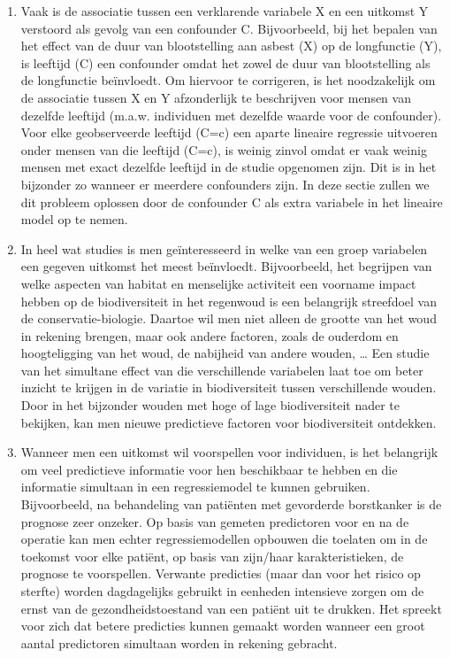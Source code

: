 \documentclass[
  12pt,dutch]{book}
\theoremstyle{definition}
\theoremstyle{definition}
\theoremstyle{definition}
\theoremstyle{definition}
\theoremstyle{remark}
\begin{document}
\begin{enumerate}
\def\labelenumi{\arabic{enumi}.}
\item
  Vaak is de associatie tussen een verklarende variabele X en een uitkomst Y verstoord als gevolg van een confounder C. Bijvoorbeeld, bij het bepalen van het effect van de duur van blootstelling aan asbest (X) op de longfunctie (Y), is leeftijd (C) een confounder omdat het zowel de duur van blootstelling als de longfunctie beïnvloedt. Om hiervoor te corrigeren, is het noodzakelijk om de associatie tussen X en Y afzonderlijk te beschrijven voor mensen van dezelfde leeftijd (m.a.w. individuen met dezelfde waarde voor de confounder). Voor elke geobserveerde leeftijd (C=c) een aparte lineaire regressie uitvoeren onder mensen van die leeftijd (C=c), is weinig zinvol omdat er vaak weinig mensen met exact dezelfde leeftijd in de studie opgenomen zijn. Dit is in het bijzonder zo wanneer er meerdere confounders zijn. In deze sectie zullen we dit probleem oplossen door de confounder C als extra variabele in het lineaire model op te nemen.
\item
  In heel wat studies is men geïnteresseerd in welke van een groep variabelen een gegeven uitkomst het meest beïnvloedt. Bijvoorbeeld, het begrijpen van welke aspecten van habitat en menselijke activiteit een voorname impact hebben op de biodiversiteit in het regenwoud is een belangrijk streefdoel van de conservatie-biologie. Daartoe wil men niet alleen de grootte van het woud in rekening brengen, maar ook andere factoren, zoals de ouderdom en hoogteligging van het woud, de nabijheid van andere wouden, \ldots{} Een studie van het simultane effect van die verschillende variabelen laat toe om beter inzicht te krijgen in de variatie in biodiversiteit tussen verschillende wouden. Door in het bijzonder wouden met hoge of lage biodiversiteit nader te bekijken, kan men nieuwe predictieve factoren voor biodiversiteit ontdekken.
\item
  Wanneer men een uitkomst wil voorspellen voor individuen, is het belangrijk om veel predictieve informatie voor hen beschikbaar te hebben en die informatie simultaan in een regressiemodel te kunnen gebruiken. Bijvoorbeeld, na behandeling van patiënten met gevorderde borstkanker is de prognose zeer onzeker. Op basis van gemeten predictoren voor en na de operatie kan men echter regressiemodellen opbouwen die toelaten om in de toekomst voor elke patiënt, op basis van zijn/haar karakteristieken, de prognose te voorspellen. Verwante predicties (maar dan voor het risico op sterfte) worden dagdagelijks gebruikt in eenheden intensieve zorgen om de ernst van de gezondheidstoestand van een patiënt uit te drukken. Het spreekt voor zich dat betere predicties kunnen gemaakt worden wanneer een groot aantal predictoren simultaan worden in rekening gebracht.
\end{enumerate}
\end{document}
